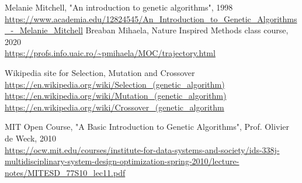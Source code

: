 \documentclass{article}
\begin{document}

\begin{thebibliography}{9}
\bibitem{} 
Melanie Mitchell, "An introduction to genetic algorithms", 1998
\\\url{https://www.academia.edu/12824545/An_Introduction_to_Genetic_Algorithms_-_Melanie_Mitchell}
\bibitem{} 
Breaban Mihaela, Nature Inspired Methods class course, 2020
\\\url{https://profs.info.uaic.ro/~pmihaela/MOC/trajectory.html}

\bibitem{} 
Wikipedia site for Selection, Mutation and Crossover
\\\url{https://en.wikipedia.org/wiki/Selection_(genetic_algorithm)}
\\\url{https://en.wikipedia.org/wiki/Mutation_(genetic_algorithm)}
\\\url{https://en.wikipedia.org/wiki/Crossover_(genetic_algorithm}

\bibitem{}
MIT Open Course, "A Basic Introduction to Genetic Algorithms", Prof. Olivier de Weck, 2010
\\\url{https://ocw.mit.edu/courses/institute-for-data-systems-and-society/ids-338j-multidisciplinary-system-design-optimization-spring-2010/lecture-notes/MITESD_77S10_lec11.pdf}
\end{thebibliography}
\end{document}

